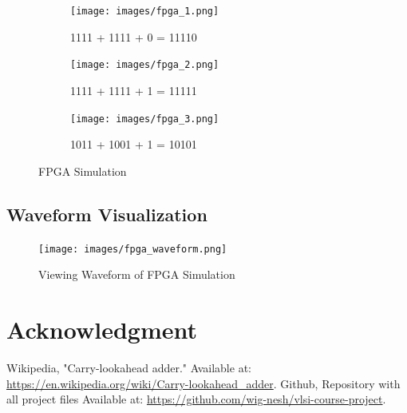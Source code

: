 \documentclass[conference]{IEEEtran}
\begin{document}
\begin{figure}[H]
    \centering
    \begin{subfigure}{0.48\textwidth}
        \texttt{[image: images/fpga\_1.png]}
        \caption{1111 + 1111 + 0 = 11110}
    \end{subfigure}
    \hfill
    \begin{subfigure}{0.48\textwidth}
        \texttt{[image: images/fpga\_2.png]}
        \caption{1111 + 1111 + 1 = 11111}
    \end{subfigure}
    \hfill
    \begin{subfigure}{0.48\textwidth}
        \texttt{[image: images/fpga\_3.png]}
        \caption{1011 + 1001 + 1 = 10101}
    \end{subfigure}
    
    \caption{FPGA Simulation}
    \label{fig:main}
\end{figure}

\subsection{Waveform Visualization}

\begin{figure}[H]
    \centering
    \texttt{[image: images/fpga\_waveform.png]}
    \caption{Viewing Waveform of FPGA Simulation}
\end{figure}

\section*{Acknowledgment}


\begin{thebibliography}{00}
     Wikipedia, "Carry-lookahead adder." Available at: \url{https://en.wikipedia.org/wiki/Carry-lookahead_adder}.
     Github, Repository with all project files Available at: \url{https://github.com/wig-nesh/vlsi-course-project}.
\end{thebibliography}
    
\end{document}
